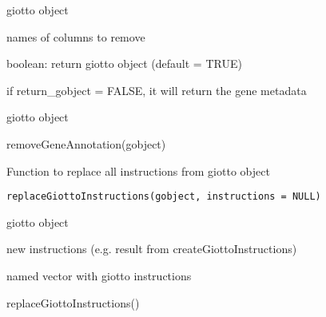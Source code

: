 \documentclass[a4paper]{book}
\begin{document}
%
\begin{Arguments}
\begin{ldescription}
\item[\code{gobject}] giotto object

\item[\code{columns}] names of columns to remove

\item[\code{return\_gobject}] boolean: return giotto object (default = TRUE)
\end{ldescription}
\end{Arguments}
%
\begin{Details}\relax
if return\_gobject = FALSE, it will return the gene metadata
\end{Details}
%
\begin{Value}
giotto object
\end{Value}
%
\begin{Examples}
\begin{ExampleCode}
    removeGeneAnnotation(gobject)
\end{ExampleCode}
\end{Examples}
%
\begin{Description}\relax
Function to replace all instructions from giotto object
\end{Description}
%
\begin{Usage}
\begin{verbatim}
replaceGiottoInstructions(gobject, instructions = NULL)
\end{verbatim}
\end{Usage}
%
\begin{Arguments}
\begin{ldescription}
\item[\code{gobject}] giotto object

\item[\code{instructions}] new instructions (e.g. result from createGiottoInstructions)
\end{ldescription}
\end{Arguments}
%
\begin{Value}
named vector with giotto instructions
\end{Value}
%
\begin{Examples}
\begin{ExampleCode}
    replaceGiottoInstructions()
\end{ExampleCode}
\end{Examples}
\end{document}
